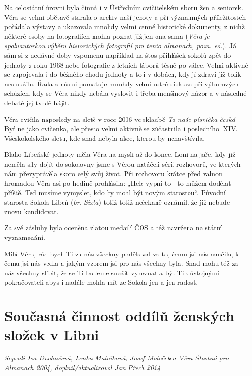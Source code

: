 Na celostátní úrovni byla činná i v Ústředním cvičitelském sboru žen a
seniorek. Věra se velmi obětavě starala o archiv naší jenoty a při
významných příležitosteh pořádala výstavy a ukazovala mnohdy velmi cenné
historické dokumenty, z nichž některé osoby na fotografiích mohla poznat
již jen ona sama (\emph{Věra je spoluautorkou výběru historických
fotografií pro tento almanach, pozn. ed.}). Já sám si z nedávné doby
vzpomenu například na štos přihlášek sokolů zpět do jednoty z roku 1968
nebo fotografie z letních táborů těsně po válce. Velmi aktivně se
zapojovala i do běžného chodu jednoty a to i v dobách, kdy jí zdraví již
tolik nesloužilo. Řada z nás si pamatuje mnohdy velmi ostré diskuze při
výborových schůzích, kdy se Věra nikdy nebála vyslovit i třeba menšinový
názor a v následné debatě jej tvrdě hájit.

Věra cvičila naposledy na sletě v roce 2006 ve skladbě \emph{Ta naše
písnička česká}. Byť ne jako cvičenka, ale přesto velmi aktivně se
zúčastnila i posledního, XIV. Všeskokolského sletu, kde snad nebyla
akce, kterou by nenavštívila.

Blaho Libeňské jednoty měla Věra na mysli až do konce. Loni na jaře, kdy
již neměla síly dojít do sokolovny jsme s Věrou natáčeli sérii
rozhovorů, ve kterých nám převyprávěla skoro celý svůj život. Při
rozhovoru krátce před valnou hromadou Věra asi po hodině prohlásila:
„Hele vypni to - to můžem dodělat příště. Teď musíme vymyslet, kdo by
mohl být novým starostou``. Původní starosta Sokola Libeň (\emph{br.
Sixta}) totiž totiž nečekaně oznámil, že již nebude znovu kandidovat.

Za své zásluhy byla oceněna zlatou medailí ČOS a též navržena na státní
vyznamenání.

Milá Věro, rád bych Ti za nás všechny poděkoval za to, čemu jsi nás
naučila, k čemu jsi nás vedla a jakým vzorem jsi pro nás všechny byla.
Snad mohu též za nás všechny slíbit, že se Ti budeme snažit vyrovnat a
být Ti důstojnými pokračovateli abys i nadále mohla mít ze Sokola jen a
jen radost.

\section{Současná činnost oddílů ženských složek v
Libni}\label{souux10dasnuxe1-ux10dinnost-odduxedlux16f-ux17eenskuxfdch-sloux17eek-v-libni}

\emph{Sepsali Iva Duchačová, Lenka Malečková, Josef Maleček a Věra
Štastná pro Almanach 2004, doplnil/aktualizoval Jan Přech 2024}

